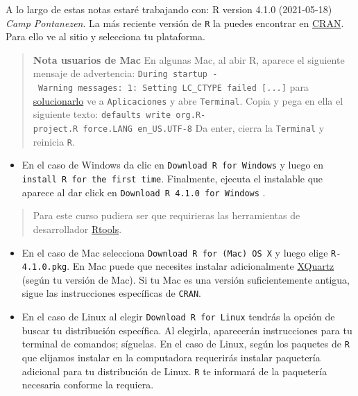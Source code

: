 \documentclass[
]{book}
\providecommand{\tightlist}{%
  \setlength{\itemsep}{0pt}\setlength{\parskip}{0pt}}
\begin{document}
A lo largo de estas notas estaré trabajando con: R version 4.1.0 (2021-05-18) \emph{Camp Pontanezen}. La más reciente versión de \texttt{R} la puedes encontrar en \href{https://cran.r-project.org}{CRAN}. Para ello ve al sitio y selecciona tu plataforma.

\begin{quote}
\textbf{Nota usuarios de Mac} En algunas Mac, al abir R, aparece el siguiente mensaje de advertencia:
\texttt{During\ startup\ -\ Warning\ messages:\ 1:\ Setting\ LC\_CTYPE\ failed\ {[}...{]}}
para \href{https://stackoverflow.com/questions/9689104/installing-r-on-mac-warning-messages-setting-lc-ctype-failed-using-c}{solucionarlo} ve a \texttt{Aplicaciones} y abre \texttt{Terminal}. Copia y pega en ella el siguiente texto:
\texttt{defaults\ write\ org.R-project.R\ force.LANG\ en\_US.UTF-8}
Da enter, cierra la \texttt{Terminal} y reinicia \texttt{R}.
\end{quote}

\begin{itemize}
\tightlist
\item
  En el caso de Windows da clic en \texttt{Download\ R\ for\ Windows} y luego en \texttt{install\ R\ for\ the\ first\ time}. Finalmente, ejecuta el instalable que aparece al dar click en \texttt{Download\ R\ 4.1.0\ for\ Windows} .
\end{itemize}

\begin{quote}
Para este curso pudiera ser que requirieras las herramientas de desarrollador \href{https://cran.r-project.org/bin/windows/Rtools/}{Rtools}.
\end{quote}

\begin{itemize}
\item
  En el caso de Mac selecciona \texttt{Download\ R\ for\ (Mac)\ OS\ X} y luego elige \texttt{R-4.1.0.pkg}. En Mac puede que necesites instalar adicionalmente \href{https://www.xquartz.org}{XQuartz} (según tu versión de Mac). Si tu Mac es una versión suficientemente antigua, sigue las instrucciones específicas de \texttt{CRAN}.
\item
  En el caso de Linux al elegir \texttt{Download\ R\ for\ Linux} tendrás la opción de buscar tu distribución específica. Al elegirla, aparecerán instrucciones para tu terminal de comandos; síguelas. En el caso de Linux, según los paquetes de \texttt{R} que elijamos instalar en la computadora requerirás instalar paquetería adicional para tu distribución de Linux. \texttt{R} te informará de la paquetería necesaria conforme la requiera.
\end{itemize}
\end{document}
